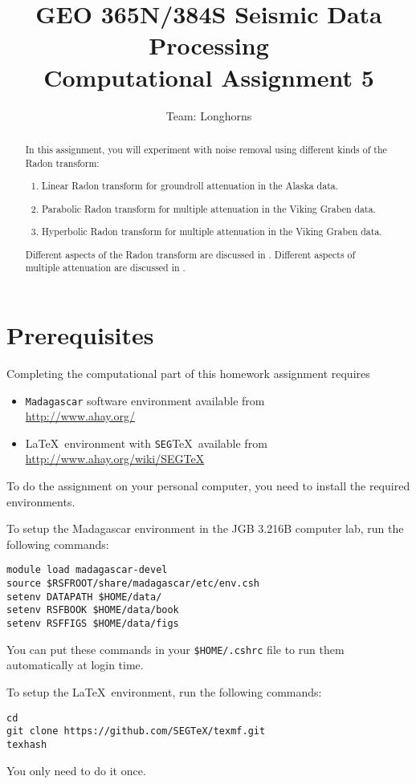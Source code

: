 \author{Team: Longhorns}
\title{GEO 365N/384S Seismic Data Processing \\ Computational Assignment 5}

\begin{abstract}
In this assignment, you will experiment with noise removal using different kinds of the Radon transform:
  \begin{enumerate}
  \item Linear Radon transform for groundroll attenuation in the Alaska data.
  \item Parabolic Radon transform for multiple attenuation in the Viking Graben data.
  \item Hyperbolic Radon transform for multiple attenuation in the Viking Graben data.
  \end{enumerate}
Different aspects of the Radon transform are discussed in \cite[]{radon}. Different aspects of multiple attenuation are discussed in \cite[]{mult}.
\end{abstract}

\section{Prerequisites}

Completing the computational part of this homework assignment requires
\begin{itemize}
\item \texttt{Madagascar} software environment available from \\
\url{http://www.ahay.org/}
\item \LaTeX\ environment with \texttt{SEG}\TeX\ available from \\ 
\url{http://www.ahay.org/wiki/SEGTeX}
\end{itemize}
To do the assignment on your personal computer, you need to install
the required environments. 

To setup the Madagascar environment in the JGB 3.216B computer lab, run the following commands:
\begin{verbatim}
module load madagascar-devel
source $RSFROOT/share/madagascar/etc/env.csh
setenv DATAPATH $HOME/data/
setenv RSFBOOK $HOME/data/book
setenv RSFFIGS $HOME/data/figs
\end{verbatim}
You can put these commands in your \verb+$HOME/.cshrc+ file to run them automatically at login time.

To setup the \LaTeX\ environment, run the following commands:
\begin{verbatim}
cd
git clone https://github.com/SEGTeX/texmf.git
texhash
\end{verbatim}
You only need to do it once.

